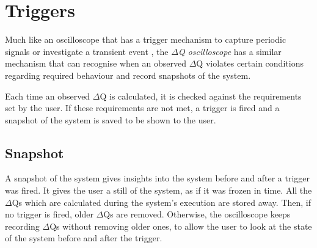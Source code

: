 \section{Triggers}
    Much like an oscilloscope that has a trigger mechanism to capture periodic signals or investigate a transient event \cite{osc-t}, the \textit{$\Delta$Q oscilloscope} has a similar mechanism that can recognise when an observed $\Delta$Q violates certain conditions regarding required behaviour and record snapshots of the system.

    Each time an observed $\Delta$Q is calculated, it is checked against the requirements set by the user. If these requirements are not met, a trigger is fired and a snapshot of the system is saved to be shown to the user. 
    
    \subsection{Snapshot}
    A snapshot of the system gives insights into the system before and after a trigger was fired. It gives the user a still of the system, as if it was frozen in time. All the $\Delta$Qs which are calculated during the system's execution are stored away. Then, if no trigger is fired, older $\Delta$Qs are removed. Otherwise, the oscilloscope keeps recording $\Delta$Qs without removing older ones, to allow the user to look at the state of the system before and after the trigger.
    
